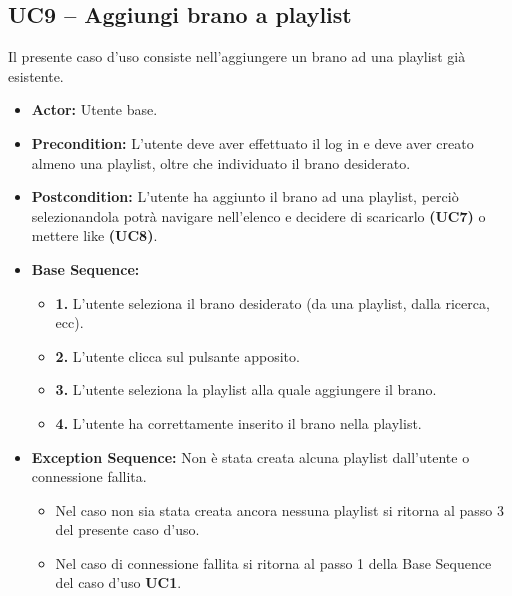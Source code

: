 \subsection{UC9 -- Aggiungi brano a playlist}
Il presente caso d'uso consiste nell'aggiungere un brano ad una playlist già esistente.
\begin{itemize}
    \item \textbf{Actor:} Utente base.
    \item \textbf{Precondition:} L'utente deve aver effettuato il log in e deve aver creato almeno una playlist, oltre che individuato il brano desiderato.
    \item \textbf{Postcondition:} L'utente ha aggiunto il brano ad una playlist, perciò selezionandola potrà navigare nell'elenco e decidere di scaricarlo \textbf{(UC7)} o mettere like \textbf{(UC8)}.
    \item \textbf{Base Sequence:}
    \begin{itemize}
        \item \textbf{1.} L'utente seleziona il brano desiderato (da una playlist, dalla ricerca, ecc).
        \item \textbf{2.} L'utente clicca sul pulsante apposito.
        \item \textbf{3.} L'utente seleziona la playlist alla quale aggiungere il brano.
        \item \textbf{4.} L'utente ha correttamente inserito il brano nella playlist.
    \end{itemize}
    \item \textbf{Exception Sequence:} Non è stata creata alcuna playlist dall'utente o connessione fallita.
    \begin{itemize}
        \item Nel caso non sia stata creata ancora nessuna playlist si ritorna al passo 3 del presente caso d'uso. 
        \item Nel caso di connessione fallita si ritorna al passo 1 della Base Sequence del caso d'uso \textbf{UC1}.
    \end{itemize}
\end{itemize}
\vspace{1cm}

